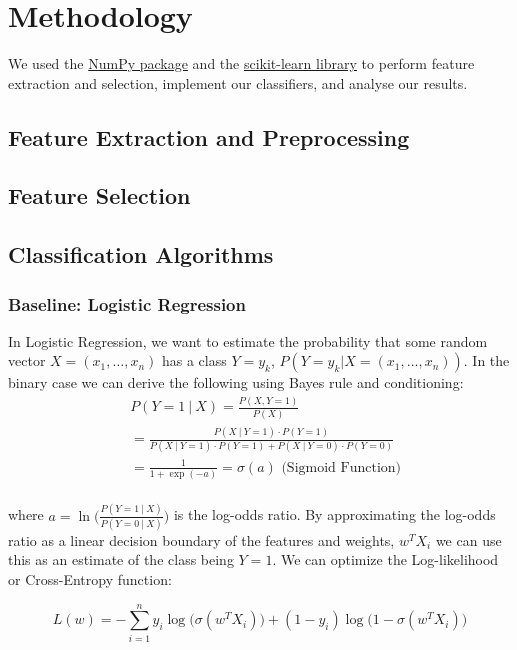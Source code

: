\documentclass[conference]{IEEEtran}
\begin{document}
\section{Methodology}

We used the \href{http://www.numpy.org/}{NumPy package} and the \href{http://www.scikit-learn.org/}{scikit-learn library} to perform feature extraction and selection, implement our classifiers, and analyse our results. 

\subsection{Feature Extraction and Preprocessing}


\subsection{Feature Selection}

\subsection{Classification Algorithms}

\subsubsection{Baseline: Logistic Regression}
In Logistic Regression, we want to estimate the probability that some random vector $X=(x_1, \ldots, x_n)$ has a class $Y=y_k$, $P(Y=y_k | X=(x_1, \ldots, x_n))$. In the binary case we can derive the following using Bayes rule and conditioning:
\begin{equation*}
\begin{split}
&P(Y=1~|~X) = \frac{P(X, Y=1)}{P(X)}\\
&= \frac{ P(X~|~Y=1)\cdot P(Y=1) }{ P(X~|~Y=1)\cdot P(Y=1) + P(X~|~Y=0)\cdot P(Y=0) }\\
& = \frac{1}{1 + \exp{(-a)}} = \sigma(a) \text{~(Sigmoid Function)}\\
\end{split}
\end{equation*}

where $a=\ln\Big(\frac{P(Y=1~|~X)}{P(Y=0~|~X)}\Big)$ is the log-odds ratio. By approximating the log-odds ratio as a linear decision boundary of the features and weights, $w^TX_i$ we can use this as an estimate of the class being $Y=1$. We can optimize the Log-likelihood or Cross-Entropy function:

\begin{equation}
	\label{LL}
	L(w) = -\sum_{i=1}^n y_i\log\Big(\sigma(w^TX_i)\Big) + (1-y_i)\log\Big(1-\sigma(w^TX_i)\Big)
\end{equation}
\end{document}
